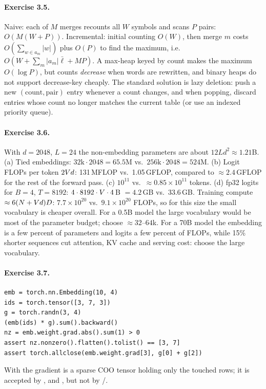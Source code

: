 \paragraph{Exercise 3.5.} Naive: each of $M$ merges recounts all $W$ symbols and scans $P$ pairs:
$O(M(W+P))$. Incremental: initial counting $O(W)$, then merge $m$ costs $O(\sum_{w\in a_m}|w|)$ plus
$O(P)$ to find the maximum, i.e.\ $O(W+\sum_m |a_m|\bar{\ell}+MP)$. A max-heap keyed by count makes the
maximum $O(\log P)$, but counts \emph{decrease} when words are rewritten, and binary heaps do not
support decrease-key cheaply. The standard solution is lazy deletion: push a new $(\text{count},\text{pair})$
entry whenever a count changes, and when popping, discard entries whose count no longer matches the
current table (or use an indexed priority queue).

\paragraph{Exercise 3.6.} With $d=2048$, $L=24$ the non-embedding parameters are about
$12Ld^2\approx1.21$B. (a) Tied embeddings: $32\text{k}\cdot2048=65.5$M vs.\ $256\text{k}\cdot2048=524$M.
(b) Logit FLOPs per token $2V d$: 131\,MFLOP vs.\ 1.05\,GFLOP, compared to $\approx2.4$\,GFLOP for the
rest of the forward pass. (c) $10^{11}$ vs.\ $\approx0.85\times10^{11}$ tokens. (d) fp32 logits for
$B=4$, $T=8192$: $4\cdot8192\cdot V\cdot4$\,B $=4.2$\,GB vs.\ 33.6\,GB. Training compute
$\approx6(N+V d)D$: $7.7\times10^{20}$ vs.\ $9.1\times10^{20}$ FLOPs, so for this size the small
vocabulary is cheaper overall. For a 0.5B model the large vocabulary would be most of the parameter
budget; choose $\approx32$--$64$k. For a 70B model the embedding is a few percent of parameters and
logits a few percent of FLOPs, while 15\% shorter sequences cut attention, KV cache and serving cost:
choose the large vocabulary.

\paragraph{Exercise 3.7.}
\begin{lstlisting}
emb = torch.nn.Embedding(10, 4)
ids = torch.tensor([3, 7, 3])
g = torch.randn(3, 4)
(emb(ids) * g).sum().backward()
nz = emb.weight.grad.abs().sum(1) > 0
assert nz.nonzero().flatten().tolist() == [3, 7]
assert torch.allclose(emb.weight.grad[3], g[0] + g[2])
\end{lstlisting}
With  the gradient is a sparse COO tensor holding only the touched rows; it is
accepted by ,  and , but not by /.

